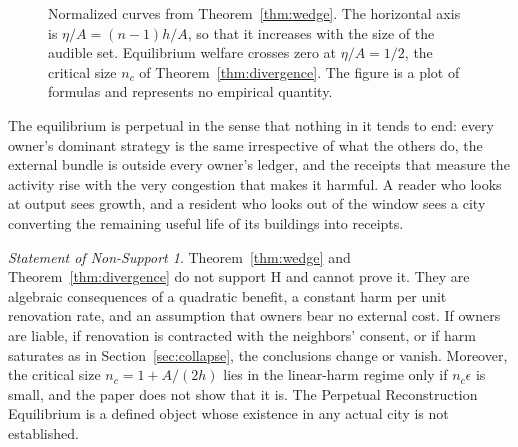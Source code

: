 \documentclass[11pt]{article}
\theoremstyle{definition}
\theoremstyle{remark}
\newtheorem{nonsupport}{Statement of Non-Support}
\begin{document}
\begin{figure}[ht]
\centering
{}
\caption{Normalized curves from Theorem~\ref{thm:wedge}. The horizontal axis is $\eta/A=(n-1)h/A$, so that it increases with the size of the audible set. Equilibrium welfare crosses zero at $\eta/A=1/2$, the critical size $n_c$ of Theorem~\ref{thm:divergence}. The figure is a plot of formulas and represents no empirical quantity.}\label{fig:welfare}
\end{figure}

The equilibrium is perpetual in the sense that nothing in it tends to end: every owner's dominant strategy is the same irrespective of what the others do, the external bundle is outside every owner's ledger, and the receipts that measure the activity rise with the very congestion that makes it harmful. A reader who looks at output sees growth, and a resident who looks out of the window sees a city converting the remaining useful life of its buildings into receipts.

\begin{nonsupport}\label{ns:equilibrium}
Theorem~\ref{thm:wedge} and Theorem~\ref{thm:divergence} do not support H and cannot prove it. They are algebraic consequences of a quadratic benefit, a constant harm per unit renovation rate, and an assumption that owners bear no external cost. If owners are liable, if renovation is contracted with the neighbors' consent, or if harm saturates as in Section~\ref{sec:collapse}, the conclusions change or vanish. Moreover, the critical size $n_c=1+A/(2h)$ lies in the linear-harm regime only if $n_c\epsilon$ is small, and the paper does not show that it is. The Perpetual Reconstruction Equilibrium is a defined object whose existence in any actual city is not established.
\end{nonsupport}
\end{document}
